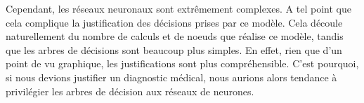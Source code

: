 Cependant, les réseaux neuronaux sont extrêmement complexes. A tel point que cela complique la justification des décisions prises par ce modèle. Cela découle naturellement du nombre de calculs et de noeuds que réalise ce modèle, tandis que les arbres de décisions sont beaucoup plus simples. En effet, rien que d'un point de vu graphique, les justifications sont plus compréhensible. C'est pourquoi, si nous devions justifier un diagnostic médical, nous aurions alors tendance à privilégier les arbres de décision aux réseaux de neurones.